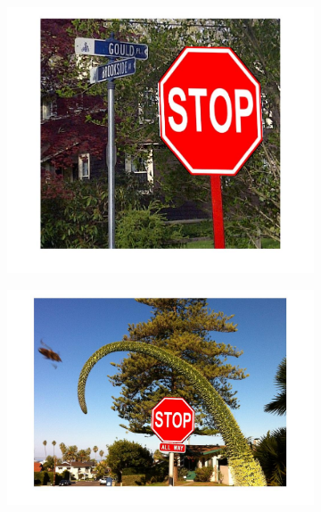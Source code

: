 \documentclass[a4paper]{iacas}
\begin{document}
\begin{figure}[!htbp]
	
	\begin{subfigure}[b]{0.32\textwidth}
		\includegraphics[width=\textwidth]{602.jpg}
		\caption{}
		\label{fig:602}
	\end{subfigure}
	\begin{subfigure}[b]{0.32\textwidth}
		\includegraphics[width=\textwidth]{603.jpg}
		\caption{}
		\label{fig:603}
	\end{subfigure}
	\begin{subfigure}[b]{0.32\textwidth}

\end{subfigure}
\end{figure}
\end{document}
